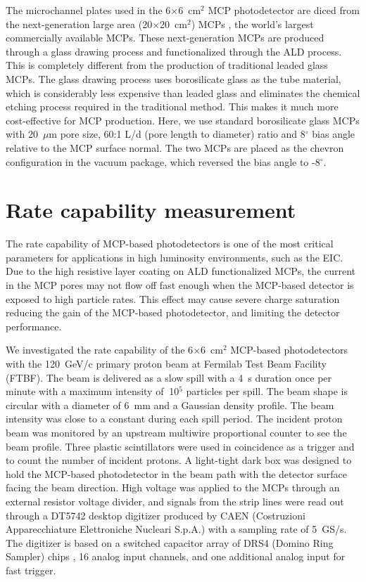 \documentclass[preprint,5p]{elsarticle}
\begin{document}
The microchannel plates used in the 6$\times$6~cm$^2$ MCP photodetector are 
diced from the next-generation large area (20$\times$20~cm$^2$) MCPs 
\cite{LAPPD,Craven-MCPs}, the world's largest commercially available MCPs.  
These next-generation MCPs are produced through a glass drawing process and 
functionalized through the ALD process. This is completely different from the 
production of traditional leaded glass MCPs. The glass drawing process uses 
borosilicate glass as the tube material, which is considerably less expensive 
than leaded glass and eliminates the chemical etching process required in the 
traditional method. This makes it much more cost-effective for MCP production.  
Here, we use standard borosilicate glass MCPs with 20~$\mu$m pore size, 60:1 
L/d (pore length to diameter) ratio and 8$^{\circ}$ bias angle relative to the 
MCP surface normal. The two MCPs are placed as the chevron configuration in the 
vacuum package, which reversed the bias angle to -8$^{\circ}$. 


\section{Rate capability measurement} \label{sec_proton_measurements}
The rate capability of MCP-based photodetectors is one of the most critical 
parameters for applications in high luminosity environments, such as the EIC.  
Due to the high resistive layer coating on ALD functionalized MCPs, the current 
in the MCP pores may not flow off fast enough when the MCP-based detector is 
exposed to high particle rates. This effect may cause severe charge saturation 
reducing the gain of the MCP-based photodetector, and limiting the detector 
performance. 
 
We investigated the rate capability of the 6$\times$6~cm$^2$ MCP-based 
photodetectors with the 120~GeV/c primary proton beam at Fermilab Test Beam 
Facility (FTBF). The beam is delivered as a slow spill with a 4~s duration once 
per minute with a maximum intensity of $~$10$^5$ particles per spill. The beam 
shape is circular with a diameter of 6~mm and a Gaussian density profile.  The 
beam intensity was close to a constant during each spill period. The incident 
proton beam was monitored by an upstream multiwire proportional counter to see 
the beam profile. Three plastic scintillators were used in coincidence as a 
trigger and to count the number of incident protons. A light-tight dark box was 
designed to hold the MCP-based photodetector in the beam path with the detector 
surface facing the beam direction. High voltage was applied to the MCPs through 
an external resistor voltage divider, and signals from the strip lines were 
read out through a DT5742 desktop digitizer \cite{Digitizer} produced by CAEN 
(Costruzioni Apparecchiature Elettroniche Nucleari S.p.A.) with a sampling rate 
of 5~GS/s. The digitizer is based on a switched capacitor array of DRS4 (Domino 
Ring Sampler) chips \cite{DRS}, 16 analog input channels, and one additional 
analog input for fast trigger.
\end{document}

